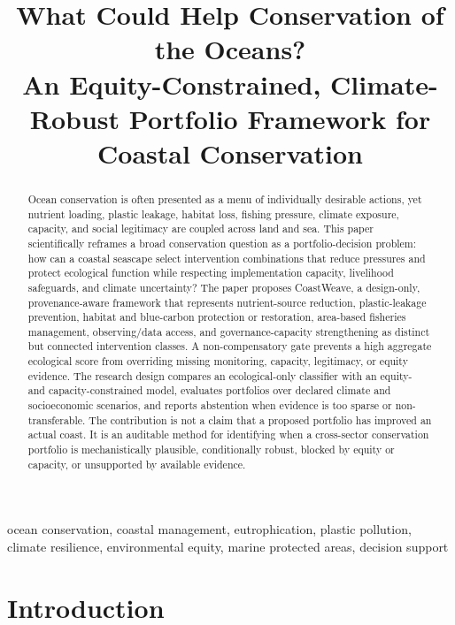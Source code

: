 \documentclass[conference]{IEEEtran}
\begin{document}
\title{What Could Help Conservation of the Oceans?\\
An Equity-Constrained, Climate-Robust Portfolio Framework for Coastal Conservation}

\author{}
\maketitle

\begin{abstract}
Ocean conservation is often presented as a menu of individually desirable actions, yet nutrient loading, plastic leakage, habitat loss, fishing pressure, climate exposure, capacity, and social legitimacy are coupled across land and sea. This paper scientifically reframes a broad conservation question as a portfolio-decision problem: how can a coastal seascape select intervention combinations that reduce pressures and protect ecological function while respecting implementation capacity, livelihood safeguards, and climate uncertainty? The paper proposes CoastWeave, a design-only, provenance-aware framework that represents nutrient-source reduction, plastic-leakage prevention, habitat and blue-carbon protection or restoration, area-based fisheries management, observing/data access, and governance-capacity strengthening as distinct but connected intervention classes. A non-compensatory gate prevents a high aggregate ecological score from overriding missing monitoring, capacity, legitimacy, or equity evidence. The research design compares an ecological-only classifier with an equity- and capacity-constrained model, evaluates portfolios over declared climate and socioeconomic scenarios, and reports abstention when evidence is too sparse or non-transferable. The contribution is not a claim that a proposed portfolio has improved an actual coast. It is an auditable method for identifying when a cross-sector conservation portfolio is mechanistically plausible, conditionally robust, blocked by equity or capacity, or unsupported by available evidence.
\end{abstract}

\begin{IEEEkeywords}
ocean conservation, coastal management, eutrophication, plastic pollution, climate resilience, environmental equity, marine protected areas, decision support
\end{IEEEkeywords}

\section{Introduction}
\end{document}
